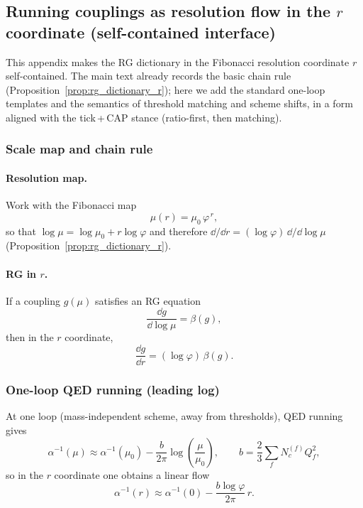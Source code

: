 \subsection{Running couplings as resolution flow in the \texorpdfstring{$r$}{r} coordinate (self-contained interface)}
\label{app:running_couplings_resolution_flow}

This appendix makes the RG dictionary in the Fibonacci resolution coordinate $r$ self-contained.
The main text already records the basic chain rule (Proposition~\ref{prop:rg_dictionary_r}); here we add the standard one-loop templates and the semantics of threshold matching and scheme shifts, in a form aligned with the tick\,+\,CAP stance (ratio-first, then matching).

\subsubsection{Scale map and chain rule}
\label{subsec:rg_chain_rule}

\paragraph{Resolution map.}
Work with the Fibonacci map
\[
\mu(r)=\mu_0\,\varphi^{\,r},
\]
so that $\log\mu=\log\mu_0+r\log\varphi$ and therefore $\dd/\dd r=(\log\varphi)\,\dd/\dd\log\mu$ (Proposition~\ref{prop:rg_dictionary_r}).

\paragraph{RG in \texorpdfstring{$r$}{r}.}
If a coupling $g(\mu)$ satisfies an RG equation
\[
\frac{\dd g}{\dd\log\mu}=\beta(g),
\]
then in the $r$ coordinate,
\begin{equation}
\label{eq:rg_in_r}
\frac{\dd g}{\dd r}=(\log\varphi)\,\beta(g).
\end{equation}

\subsubsection{One-loop QED running (leading log)}
\label{subsec:qed_one_loop}

At one loop (mass-independent scheme, away from thresholds), QED running gives
\begin{equation}
\label{eq:qed_one_loop}
\alpha^{-1}(\mu)\approx \alpha^{-1}(\mu_0)-\frac{b}{2\pi}\log\!\left(\frac{\mu}{\mu_0}\right),
\qquad
b=\frac{2}{3}\sum_f N_c^{(f)}Q_f^2,
\end{equation}
so in the $r$ coordinate one obtains a linear flow
\begin{equation}
\label{eq:qed_one_loop_r}
\alpha^{-1}(r)\approx \alpha^{-1}(0)-\frac{b\log\varphi}{2\pi}\,r.
\end{equation}

